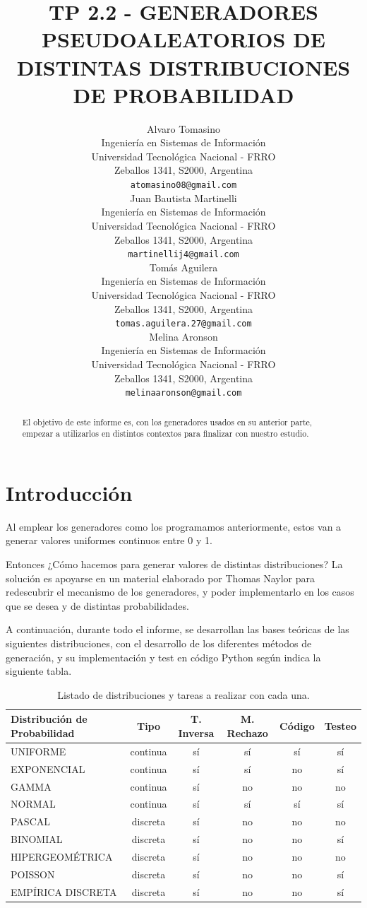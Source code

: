 \documentclass{article}
\title{TP 2.2 - GENERADORES PSEUDOALEATORIOS DE DISTINTAS DISTRIBUCIONES DE PROBABILIDAD}
\author{
    Alvaro Tomasino \\
    Ingeniería en Sistemas de Información\\
    Universidad Tecnológica Nacional - FRRO\\
    Zeballos 1341, S2000, Argentina\\
    \texttt{atomasino08@gmail.com} \\
\And
    Juan Bautista Martinelli \\
    Ingeniería en Sistemas de Información\\
    Universidad Tecnológica Nacional - FRRO\\
    Zeballos 1341, S2000, Argentina\\
    \texttt{martinellij4@gmail.com} \\
\And
    Tomás Aguilera \\
    Ingeniería en Sistemas de Información\\
    Universidad Tecnológica Nacional - FRRO\\
    Zeballos 1341, S2000, Argentina\\
    \texttt{tomas.aguilera.27@gmail.com} \\
\And
    Melina Aronson \\
    Ingeniería en Sistemas de Información\\
    Universidad Tecnológica Nacional - FRRO\\
    Zeballos 1341, S2000, Argentina\\
    \texttt{melinaaronson@gmail.com} \\
}
\begin{document}
\maketitle




\begin{abstract}
El objetivo de este informe es, con los generadores usados en su anterior parte, empezar a
utilizarlos en distintos contextos para finalizar con nuestro estudio.
\end{abstract}





\section{Introducción}

Al emplear los generadores como los programamos anteriormente, estos van a generar
valores uniformes continuos entre 0 y 1.

Entonces ¿Cómo hacemos para generar valores de distintas distribuciones? La solución es
apoyarse en un material elaborado por Thomas Naylor para redescubrir el mecanismo de
los generadores, y poder implementarlo en los casos que se desea y de distintas
probabilidades.

A continuación, durante todo el informe, se desarrollan las bases teóricas de las siguientes
distribuciones, con el desarrollo de los diferentes métodos de generación, y su
implementación y test en código Python según indica la siguiente tabla.

\begin{table}[H]
    \centering
    \begin{tabular}{lccccc}
        \toprule
        \textbf{Distribución de Probabilidad} & \textbf{Tipo} & \textbf{T. Inversa} & \textbf{M. Rechazo} & \textbf{Código} & \textbf{Testeo} \\
        \midrule
        UNIFORME          & continua & sí & sí & sí & sí \\
        EXPONENCIAL       & continua & sí & sí & no & sí \\
        GAMMA             & continua & sí & no & no & no \\
        NORMAL            & continua & sí & sí & sí & sí \\
        PASCAL            & discreta & sí & no & no & no \\
        BINOMIAL          & discreta & sí & no & no & sí \\
        HIPERGEOMÉTRICA   & discreta & sí & no & no & no \\
        POISSON           & discreta & sí & no & no & sí \\
        EMPÍRICA DISCRETA & discreta & sí & no & no & sí \\
        \bottomrule
    \end{tabular}
    \caption{Listado de distribuciones y tareas a realizar con cada una.}
    \label{tab:distribuciones}
\end{table}
\end{document}
